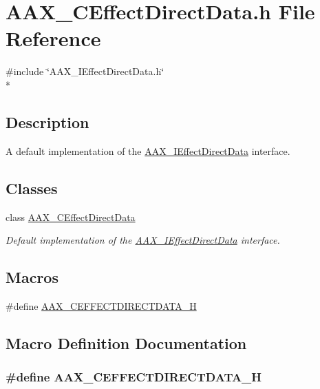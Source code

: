 \hypertarget{a00170}{}\section{A\+A\+X\+\_\+\+C\+Effect\+Direct\+Data.\+h File Reference}
\label{a00170}
{\ttfamily \#include \char`\"{}A\+A\+X\+\_\+\+I\+Effect\+Direct\+Data.\+h\char`\"{}}\\*


\subsection{Description}
A default implementation of the \hyperlink{a00097}{A\+A\+X\+\_\+\+I\+Effect\+Direct\+Data} interface. 

\subsection*{Classes}
\begin{DoxyCompactItemize}
\item 
class \hyperlink{a00016}{A\+A\+X\+\_\+\+C\+Effect\+Direct\+Data}
\begin{DoxyCompactList}\small\item\em Default implementation of the \hyperlink{a00097}{A\+A\+X\+\_\+\+I\+Effect\+Direct\+Data} interface. \end{DoxyCompactList}\end{DoxyCompactItemize}
\subsection*{Macros}
\begin{DoxyCompactItemize}
\item 
\#define \hyperlink{a00170_a2f5665c1c3258dde09787cfdd58ad520}{A\+A\+X\+\_\+\+C\+E\+F\+F\+E\+C\+T\+D\+I\+R\+E\+C\+T\+D\+A\+T\+A\+\_\+\+H}
\end{DoxyCompactItemize}


\subsection{Macro Definition Documentation}
\hypertarget{a00170_a2f5665c1c3258dde09787cfdd58ad520}{}
\subsubsection[{A\+A\+X\+\_\+\+C\+E\+F\+F\+E\+C\+T\+D\+I\+R\+E\+C\+T\+D\+A\+T\+A\+\_\+\+H}]{\setlength{\rightskip}{0pt plus 5cm}\#define A\+A\+X\+\_\+\+C\+E\+F\+F\+E\+C\+T\+D\+I\+R\+E\+C\+T\+D\+A\+T\+A\+\_\+\+H}\label{a00170_a2f5665c1c3258dde09787cfdd58ad520}
